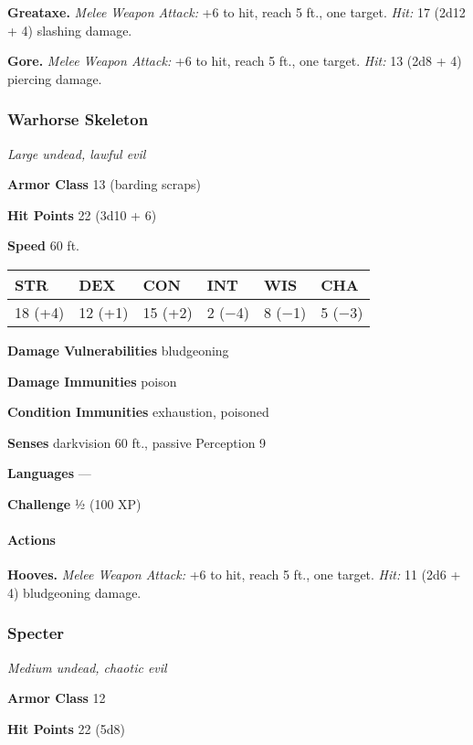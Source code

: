 \documentclass[
]{article}
\begin{document}
\textbf{Greataxe.} \emph{Melee Weapon Attack:} +6 to hit, reach 5 ft.,
one target. \emph{Hit:} 17 (2d12 + 4) slashing damage.

\textbf{Gore.} \emph{Melee Weapon Attack:} +6 to hit, reach 5 ft., one
target. \emph{Hit:} 13 (2d8 + 4) piercing damage.

\hypertarget{warhorse-skeleton}{%
\subsubsection{Warhorse Skeleton}\label{warhorse-skeleton}}

\emph{Large undead, lawful evil}

\textbf{Armor Class} 13 (barding scraps)

\textbf{Hit Points} 22 (3d10 + 6)

\textbf{Speed} 60 ft.

\begin{longtable}[]{@{}llllll@{}}
\toprule
STR & DEX & CON & INT & WIS & CHA\tabularnewline
\midrule
\endhead
18 (+4) & 12 (+1) & 15 (+2) & 2 (−4) & 8 (−1) & 5 (−3)\tabularnewline
\bottomrule
\end{longtable}

\textbf{Damage Vulnerabilities} bludgeoning

\textbf{Damage Immunities} poison

\textbf{Condition Immunities} exhaustion, poisoned

\textbf{Senses} darkvision 60 ft., passive Perception 9

\textbf{Languages} ---

\textbf{Challenge} ½ (100 XP)

\hypertarget{actions-8}{%
\paragraph{Actions}\label{actions-8}}

\textbf{Hooves.} \emph{Melee Weapon Attack:} +6 to hit, reach 5 ft., one
target. \emph{Hit:} 11 (2d6 + 4) bludgeoning damage.

\hypertarget{specter}{%
\subsubsection{Specter}\label{specter}}

\emph{Medium undead, chaotic evil}

\textbf{Armor Class} 12

\textbf{Hit Points} 22 (5d8)
\end{document}
